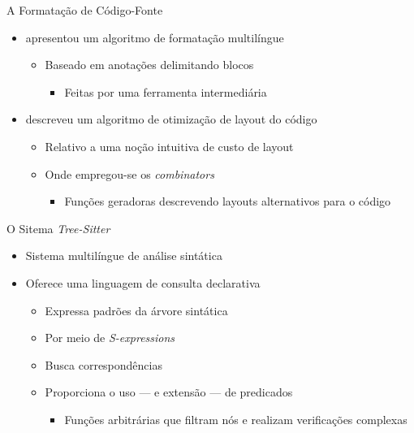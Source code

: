 \documentclass
  [ aspectratio=169,
    english,
    hyperref={citecolor=blue,colorlinks=true,linkcolor=blue,urlcolor=blue},
    brazil]
  {beamer}
\newcommand{\treesitter}{\textit{Tree-Sitter}\xspace}
\begin{document}

  \begin{frame}{A Formatação de Código-Fonte}
    \begin{itemize}
      \item \textcite{oppen-1980-prettyprinting} apresentou um algoritmo
            de formatação multilíngue
            \begin{itemize}
              \item Baseado em anotações delimitando blocos
                    \begin{itemize}
                      \item Feitas por uma ferramenta intermediária
                    \end{itemize}
            \end{itemize}
      \item \textcite{yelland-2015-new} descreveu um algoritmo de otimização de
            layout do código
            \begin{itemize}
              \item Relativo a uma noção intuitiva de custo de layout
              \item Onde empregou-se os \textit{combinators}
                    \begin{itemize}
                      \item Funções geradoras descrevendo layouts alternativos
                            para o código
                    \end{itemize}
            \end{itemize}
    \end{itemize}
  \end{frame}


  \begin{frame}{O Sitema \treesitter}
    \begin{itemize}
      \item Sistema multilíngue de análise sintática
      \item Oferece uma linguagem de consulta declarativa
            \begin{itemize}
              \item Expressa padrões da árvore sintática
              \item Por meio de \textit{S-expressions}
              \item Busca correspondências
              \item Proporciona o uso --- e extensão --- de predicados
                    \begin{itemize}
                      \item Funções arbitrárias que filtram nós e realizam
                            verificações complexas
                    \end{itemize}
            \end{itemize}
    \end{itemize}
  \end{frame}
\end{document}
